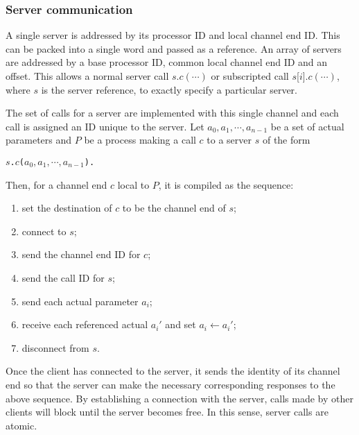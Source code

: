 \documentclass[11pt, conference, compsocconf, onecolumn]{IEEEtran}
\newcommand{\ben}{\begin{enumerate}}
\newcommand{\een}{\end{enumerate}}
\newcounter{process}
\def\codespacing{1.5mm}
\newenvironment{myquote}
{\list{}{\leftmargin=4mm\rightmargin=4mm}\item[]}
{\endlist}
\newcommand{\code}[1]{
\vspace{\codespacing}\begin{myquote}\begin{alltt}#1\end{alltt}\end{myquote}\vspace{\codespacing}
}
\begin{document}
\subsubsection{Server communication}

A single server is addressed by its processor ID and local channel end ID. This
can be packed into a single word and passed as a reference. An array of
servers are addressed by a base processor ID, common local channel end ID and
an offset. This allows a normal server call $s$.$c(\cdots)$ or subscripted call
$s$[$i$].$c(\cdots)$, where $s$ is the server reference, to exactly specify a
particular server.

The set of calls for a server are implemented with this single channel and each
call is assigned an ID unique to the server.  
Let $a_0, a_1, \cdots, a_{n-1}$ be a set of actual parameters and $P$ be a
process making a call $c$ to a server $s$ of the form \code{$s$.$c$($a_0, a_1,
\cdots, a_{n-1}$).} Then, for a channel end $c$ local to $P$, it is compiled as
the sequence: 
\ben

\item set the destination of $c$ to be the channel end of $s$;

\item connect to $s$;

\item send the channel end ID for $c$;

\item send the call ID for $s$;

\item send each actual parameter $a_i$;

\item receive each referenced actual $a_i'$ and set $a_i\gets a_i'$;

\item disconnect from $s$.

\een
Once the client has connected to the server, it sends the identity of its
channel end so that the server can make the necessary corresponding responses
to the above sequence.
By establishing a connection with the server, calls made by other clients will
block until the server becomes free. In this sense, server calls are atomic.
\end{document}
